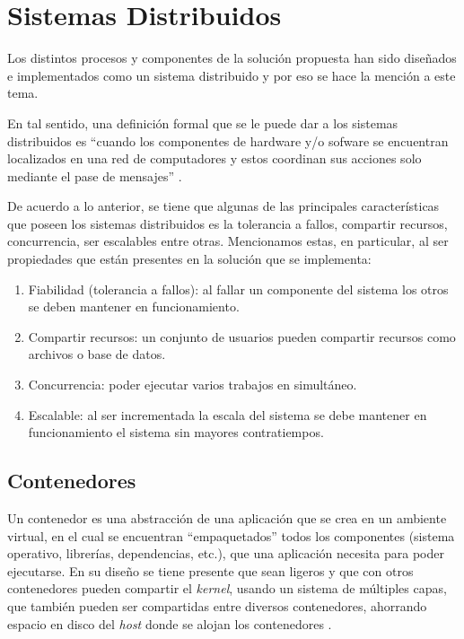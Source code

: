 \documentclass[
  12pt,
  openany]{book}
\begin{document}
\hypertarget{SD}{%
\section{Sistemas Distribuidos}\label{SD}}

Los distintos procesos y componentes de la solución propuesta han sido diseñados e implementados como un sistema distribuido y por eso se hace la mención a este tema.

En tal sentido, una definición formal que se le puede dar a los sistemas distribuidos es ``cuando los componentes de hardware y/o sofware se encuentran localizados en una red de computadores y estos coordinan sus acciones solo mediante el pase de mensajes'' \citep{distribu2012}.

De acuerdo a lo anterior, se tiene que algunas de las principales características que poseen los sistemas distribuidos es la tolerancia a fallos, compartir recursos, concurrencia, ser escalables \citep{czaja2018} entre otras. Mencionamos estas, en particular, al ser propiedades que están presentes en la solución que se implementa:

\begin{enumerate}
\def\labelenumi{\arabic{enumi}.}
\item
  Fiabilidad (tolerancia a fallos): al fallar un componente del sistema los otros se deben mantener en funcionamiento.
\item
  Compartir recursos: un conjunto de usuarios pueden compartir recursos como archivos o base de datos.
\item
  Concurrencia: poder ejecutar varios trabajos en simultáneo.
\item
  Escalable: al ser incrementada la escala del sistema se debe mantener en funcionamiento el sistema sin mayores contratiempos.
\end{enumerate}

\hypertarget{contenedores}{%
\subsection{Contenedores}\label{contenedores}}

Un contenedor es una abstracción de una aplicación que se crea en un ambiente virtual, en el cual se encuentran ``empaquetados'' todos los componentes (sistema operativo, librerías, dependencias, etc.), que una aplicación necesita para poder ejecutarse. En su diseño se tiene presente que sean ligeros y que con otros contenedores pueden compartir el \emph{kernel}, usando un sistema de múltiples capas, que también pueden ser compartidas entre diversos contenedores, ahorrando espacio en disco del \emph{host} donde se alojan los contenedores \citep{nüst2020}.
\end{document}
